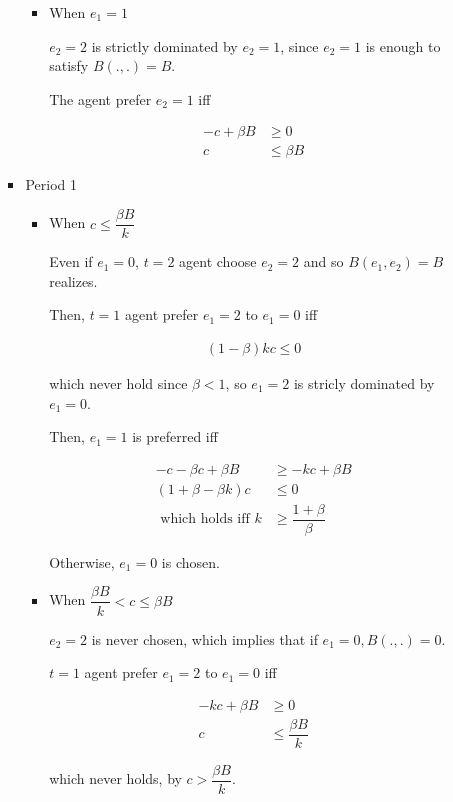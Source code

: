 \documentclass{jsarticle}
\begin{document}
\begin{enumerate}
\begin{enumerate}
\begin{itemize}
\begin{itemize}
\item When $e_1=1$

$e_2=2$ is strictly dominated by $e_2=1$, since $e_2=1$ is enough to satisfy $B(.,.)=B$.

The agent prefer $e_2=1$ iff

\begin{align*}
-c + \beta B & \geq 0 \\
c & \leq \beta B
\end{align*}

\end{itemize}

\newpage

\item Period 1

\begin{itemize}

\item When $c \leq \dfrac{\beta B}{k}$

Even if $e_1=0$, $t=2$ agent choose $e_2=2$ and so $B(e_1, e_2)=B$ realizes.

Then, $t=1$ agent prefer $e_1=2$ to $e_1=0$ iff

\begin{align*}
(1-\beta)kc \leq 0
\end{align*}

which never hold since $\beta<1$, so $e_1=2$ is stricly dominated by $e_1=0$.

Then, $e_1=1$ is preferred iff

\begin{align*}
-c - \beta c + \beta B &\geq - kc + \beta B \\
(1+\beta - \beta k)c &\leq 0 \\
\text{ which holds iff }
k &\geq \dfrac{1+\beta}{\beta}
\end{align*}

Otherwise, $e_1=0$ is chosen.

\item When $\dfrac{\beta B}{k} < c \leq \beta B $

$e_2=2$ is never chosen, which implies that if $e_1=0,B(.,.)=0$.

$t=1$ agent prefer $e_1=2$ to $e_1=0$ iff

\begin{align*}
- kc + \beta B &\geq 0 \\
c &\leq \dfrac{\beta B}{k}
\end{align*}

which never holds, by $c>\dfrac{\beta B}{k}$.


\end{itemize}
\end{itemize}
\end{enumerate}
\end{enumerate}
\end{document}

